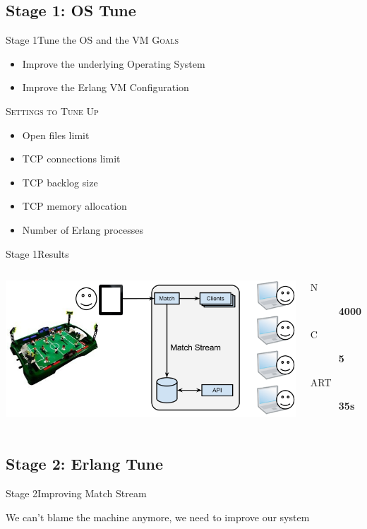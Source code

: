 \documentclass[utf8]{beamer}
\begin{document}
\subsection{Stage 1: OS Tune}
\begin{frame}{Stage 1}{Tune the OS and the VM}
	\textsc{Goals}
	\begin{itemize}
		\item Improve the underlying Operating System
		\item Improve the Erlang VM Configuration
	\end{itemize}
	\pause
	\textsc{Settings to Tune Up}
	\begin{itemize}
		\item<+-> Open files limit
		\item<+-> TCP connections limit
		\item<+-> TCP backlog size
		\item<+-> TCP memory allocation
		\item<+-> Number of Erlang processes
	\end{itemize}
\end{frame}
\begin{frame}{Stage 1}{Results}
	\begin{columns}
			\includegraphics[top=-1,width=\textwidth]{img/results-2.png}
			\begin{description}
				\item[N] \textbf{\Large 4000}
				\item[C] \textbf{\Large 5}
				\item[ART] \textbf{\Large 35s}
			\end{description}
	\end{columns}
\end{frame}

\subsection{Stage 2: Erlang Tune}
\begin{frame}{Stage 2}{Improving Match Stream}
	\begin{center}
		\Large We can't blame the machine anymore, we need to improve \alert{our system}
	\end{center}
\end{frame}
\end{document}
